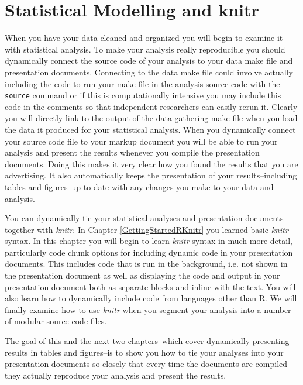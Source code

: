 



\chapter{Statistical Modelling and knitr}\label{StatsModel}

When you have your data cleaned and organized you will begin to examine it with statistical analysis. To make your analysis really reproducible you should dynamically connect the source code of your analysis to your data make file and presentation documents. Connecting to the data make file could involve actually including the code to run your make file in the analysis source code with the \texttt{source} command or if this is computationally intensive you may include this code in the comments so that independent researchers can easily rerun it. Clearly you will directly link to the output of the data gathering make file when you load the data it produced for your statistical analysis. When you dynamically connect your source code file to your markup document you will be able to run your analysis and present the results whenever you compile the presentation documents. Doing this makes it very clear how you found the results that you are advertising. It also automatically keeps the presentation of your results--including tables and figures--up-to-date with any changes you make to your data and analysis.

You can dynamically tie your statistical analyses and presentation documents together with {\emph{knitr}}. In Chapter \ref{GettingStartedRKnitr} you learned basic {\emph{knitr}} syntax. In this chapter you will begin to learn {\emph{knitr}} syntax in much more detail, particularly code chunk options for including dynamic code in your presentation documents. This includes code that is run in the background, i.e. not shown in the presentation document as well as displaying the code and output in your presentation document both as separate blocks and inline with the text. You will also learn how to dynamically include code from languages other than R. We will finally examine how to use {\emph{knitr}} when you segment your analysis into a number of modular source code files. 

The goal of this and the next two chapters--which cover dynamically presenting results in tables and figures--is to show you how to tie your analyses into your presentation documents so closely that every time the documents are compiled they actually reproduce your analysis and present the results.

